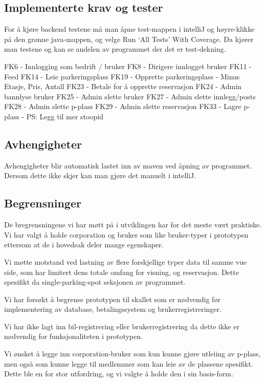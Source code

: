 \documentclass[12pt]{article}
\begin{document}
    \subsection{Implementerte krav og tester}
    For å kjøre backend testene må man åpne test-mappen i intelliJ og høyre-klikke på den grønne java-mappen, og velge Run ‘All Tests’ With Coverage. Da kjører man testene og kan se andelen av programmet der det er test-dekning.

    FK6 - Innlogging som bedrift / bruker
    FK8 - Dirigere innlogget bruker
    FK11 - Feed
    FK14 - Leie parkeringsplass
    FK19 - Opprette parkeringsplass
            - Minus Etasje, Pris, Antall
    FK23 - Betale for å opprette reservasjon
    FK24 - Admin bannlyse bruker
    FK25 - Admin slette bruker
    FK27 - Admin slette innlegg/posts
    FK28 - Admin slette p-plass
    FK29 - Admin slette reservasjon
    FK33 - Lagre p-plass
            - PS: Legg til mer stoopid


    \subsection{Avhengigheter}
    Avhengigheter blir automatisk lastet inn av maven ved åpning av programmet. Dersom dette ikke skjer kan man gjøre det manuelt i intelliJ.

    \subsection{Begrensninger}
    De bregrensningene vi har møtt på i utviklingen har for det meste vært praktiske. Vi har valgt å holde corporation og bruker som like bruker-typer i prototypen ettersom at de i hovedsak deler mange egenskaper.
    
    Vi møtte motstand ved lastning av flere forskjellige typer data til samme vue side, som har limitert dens totale omfang for visning, og reservasjon. Dette spesifikt da single-parking-spot seksjonen av programmet.
    
    Vi har forsøkt å begrense prototypen til skallet som er nødvendig før implementering av database, betalingssystem og brukerregistreringer.
    
    Vi har ikke lagt inn bil-registrering eller brukerregistrering da dette ikke er nødvendig for funksjonaliteten i prototypen. 
    
    Vi ønsket å legge inn corporation-bruker som kun kunne gjøre utleiing av p-plass, men også som kunne legge til medlemmer som kan leie av de plassene spesifikt. Dette ble en for stor utfordring, og vi valgte å holde den i sin basis-form.
    
\end{document}
